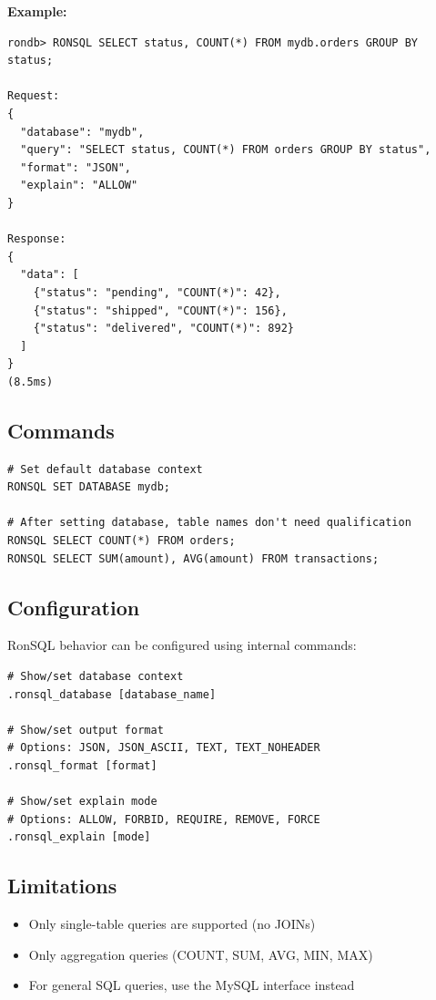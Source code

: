 \documentclass[11pt,a4paper]{report}
\begin{document}
\textbf{Example:}
\begin{lstlisting}[language=rondb]
rondb> RONSQL SELECT status, COUNT(*) FROM mydb.orders GROUP BY status;

Request:
{
  "database": "mydb",
  "query": "SELECT status, COUNT(*) FROM orders GROUP BY status",
  "format": "JSON",
  "explain": "ALLOW"
}

Response:
{
  "data": [
    {"status": "pending", "COUNT(*)": 42},
    {"status": "shipped", "COUNT(*)": 156},
    {"status": "delivered", "COUNT(*)": 892}
  ]
}
(8.5ms)
\end{lstlisting}

\subsection{Commands}

\begin{lstlisting}[language=rondb]
# Set default database context
RONSQL SET DATABASE mydb;

# After setting database, table names don't need qualification
RONSQL SELECT COUNT(*) FROM orders;
RONSQL SELECT SUM(amount), AVG(amount) FROM transactions;
\end{lstlisting}

\subsection{Configuration}

RonSQL behavior can be configured using internal commands:

\begin{lstlisting}[language=rondb]
# Show/set database context
.ronsql_database [database_name]

# Show/set output format
# Options: JSON, JSON_ASCII, TEXT, TEXT_NOHEADER
.ronsql_format [format]

# Show/set explain mode
# Options: ALLOW, FORBID, REQUIRE, REMOVE, FORCE
.ronsql_explain [mode]
\end{lstlisting}

\subsection{Limitations}

\begin{itemize}
    \item Only single-table queries are supported (no JOINs)
    \item Only aggregation queries (COUNT, SUM, AVG, MIN, MAX)
    \item For general SQL queries, use the MySQL interface instead
\end{itemize}
\end{document}
